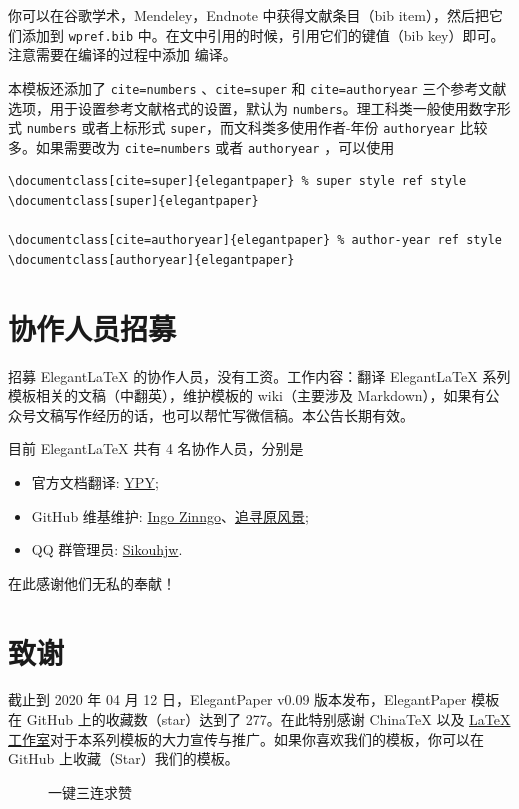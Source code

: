 \documentclass[lang=cn,11pt,a4paper,cite=authoryear]{elegantpaper}
\begin{document}
你可以在谷歌学术，Mendeley，Endnote 中获得文献条目（bib item），然后把它们添加到 \lstinline{wpref.bib} 中。在文中引用的时候，引用它们的键值（bib key）即可。注意需要在编译的过程中添加  编译。

本模板还添加了 \lstinline{cite=numbers} 、\lstinline{cite=super} 和 \lstinline{cite=authoryear}  三个参考文献选项，用于设置参考文献格式的设置，默认为 \lstinline{numbers}。理工科类一般使用数字形式 \lstinline{numbers} 或者上标形式 \lstinline{super}，而文科类多使用作者-年份 \lstinline{authoryear} 比较多。如果需要改为 \lstinline{cite=numbers}  或者  \lstinline{authoryear} ，可以使用
\begin{lstlisting}
\documentclass[cite=super]{elegantpaper} % super style ref style
\documentclass[super]{elegantpaper}

\documentclass[cite=authoryear]{elegantpaper} % author-year ref style
\documentclass[authoryear]{elegantpaper}
\end{lstlisting}


\section{协作人员招募}
招募 Elegant\LaTeX{} 的协作人员，没有工资。工作内容：翻译 Elegant\LaTeX{} 系列模板相关的文稿（中翻英），维护模板的 wiki（主要涉及 Markdown），如果有公众号文稿写作经历的话，也可以帮忙写微信稿。本公告长期有效。

目前 ElegantLaTeX 共有 4 名协作人员，分别是
\begin{itemize}
  \item 官方文档翻译: \href{https://github.com/peggy2006xzyz}{YPY};
  \item GitHub 维基维护: \href{https://github.com/izinngo}{Ingo Zinngo}、\href{https://github.com/xiaohao890809}{追寻原风景};
  \item QQ 群管理员: \href{https://github.com/sikouhjw}{Sikouhjw}.
\end{itemize}

在此感谢他们无私的奉献！


\section{致谢}
截止到 2020 年 04 月 12 日，ElegantPaper v0.09 版本发布，ElegantPaper 模板在 GitHub 上的收藏数（star）达到了 277。在此特别感谢 China\TeX{} 以及 \href{http://www.latexstudio.net/}{\LaTeX{} 工作室}对于本系列模板的大力宣传与推广。如果你喜欢我们的模板，你可以在 GitHub 上收藏（Star）我们的模板。
\begin{figure}[htbp]
  \centering

  \caption{一键三连求赞}
\end{figure}
\end{document}
